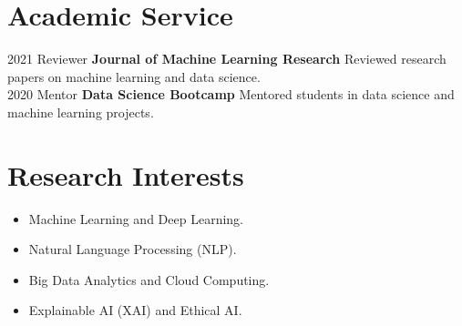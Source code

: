 \documentclass[letterpaper]{CV_class_file} %
\begin{document}
\section{Academic Service}

\begin{twenty}
    \twentyitem
        {2021}
        {}
        {\hspace{0.3cm}Reviewer}
        {\textbf{Journal of Machine Learning Research}}
        {}
        {Reviewed research papers on machine learning and data science.}
    \\
    \twentyitem
        {2020}
        {}
        {\hspace{0.3cm}Mentor}
        {\textbf{Data Science Bootcamp}}
        {}
        {Mentored students in data science and machine learning projects.}
\end{twenty}

\section{Research Interests}

\begin{twenty}
    \twentyitemshort
        {}
        {\begin{itemize}
            \item Machine Learning and Deep Learning.
            \item Natural Language Processing (NLP).
            \item Big Data Analytics and Cloud Computing.
            \item Explainable AI (XAI) and Ethical AI.
        \end{itemize}}
\end{twenty}
\end{document}
